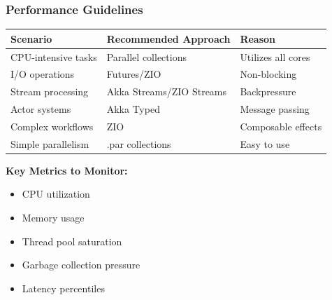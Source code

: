 \documentclass{beamer}
\begin{document}
\begin{frame}
\frametitle{Performance Guidelines}

\begin{table}
\centering
\begin{tabular}{|l|l|l|}
\hline
\textbf{Scenario} & \textbf{Recommended Approach} & \textbf{Reason} \\
\hline
CPU-intensive tasks & Parallel collections & Utilizes all cores \\
\hline
I/O operations & Futures/ZIO & Non-blocking \\
\hline
Stream processing & Akka Streams/ZIO Streams & Backpressure \\
\hline
Actor systems & Akka Typed & Message passing \\
\hline
Complex workflows & ZIO & Composable effects \\
\hline
Simple parallelism & .par collections & Easy to use \\
\hline
\end{tabular}
\end{table}

\vspace{1em}

\textbf{Key Metrics to Monitor:}
\begin{itemize}
\item CPU utilization
\item Memory usage
\item Thread pool saturation
\item Garbage collection pressure
\item Latency percentiles
\end{itemize}

\end{frame}
\end{document}

